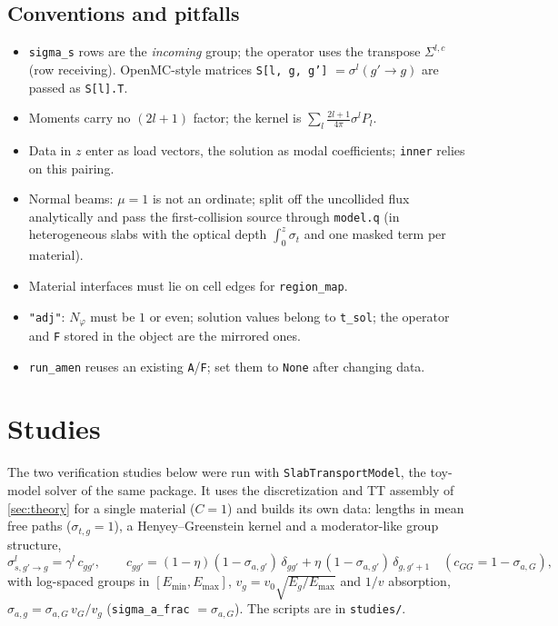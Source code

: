 \documentclass[11pt,a4paper]{article}
\newcommand{\code}[1]{\texttt{#1}}
\begin{document}
\subsection{Conventions and pitfalls}
\begin{itemize}[nosep]
\item \code{sigma\_s} rows are the \emph{incoming} group; the operator uses the transpose $\Sigma^{l,c}$ (row receiving). OpenMC-style matrices \code{S[l, g, g']} $=\sigma^l(g'\to g)$ are passed as \code{S[l].T}.
\item Moments carry no $(2l+1)$ factor; the kernel is $\sum_l\frac{2l+1}{4\pi}\sigma^lP_l$.
\item Data in $z$ enter as load vectors, the solution as modal coefficients; \code{inner} relies on this pairing.
\item Normal beams: $\mu=1$ is not an ordinate; split off the uncollided flux analytically and pass the first-collision source through \code{model.q} (in heterogeneous slabs with the optical depth $\int_0^z\sigma_{t}$ and one masked term per material).
\item Material interfaces must lie on cell edges for \code{region\_map}.
\item \code{"adj"}: $N_\varphi$ must be $1$ or even; solution values belong to \code{t\_sol}; the operator and \code{F} stored in the object are the mirrored ones.
\item \code{run\_amen} reuses an existing \code{A}/\code{F}; set them to \code{None} after changing data.
\end{itemize}

\section{Studies}
\label{sec:studies}

The two verification studies below were run with \code{SlabTransportModel}, the toy-model solver of the same package. It uses the discretization and TT assembly of \cref{sec:theory} for a single material ($C=1$) and builds its own data: lengths in mean free paths ($\sigma_{t,g}=1$), a Henyey--Greenstein kernel \cite{HG} and a moderator-like group structure,
\begin{equation}
\sigma^l_{s,g'\to g}=\gamma^l\,c_{gg'},\qquad
c_{gg'}=(1-\eta)(1-\sigma_{a,g'})\,\delta_{gg'}+\eta\,(1-\sigma_{a,g'})\,\delta_{g,g'+1}\quad(c_{GG}=1-\sigma_{a,G}),
\end{equation}
with log-spaced groups in $[E_{\min},E_{\max}]$, $v_g=v_0\sqrt{E_g/E_{\max}}$ and $1/v$ absorption, $\sigma_{a,g}=\sigma_{a,G}\,v_G/v_g$ (\code{sigma\_a\_frac} $=\sigma_{a,G}$). The scripts are in \code{studies/}.
\end{document}

